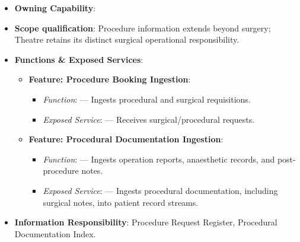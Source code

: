 \begin{itemize}

\item 
\textbf{Owning Capability}: \texttt{}



\item 
\textbf{Scope qualification}: Procedure information extends beyond surgery; Theatre retains its distinct surgical operational responsibility.



\item 
\textbf{Functions \& Exposed Services}:


\begin{itemize}

\item 
\textbf{Feature: Procedure Booking Ingestion}:


\begin{itemize}

\item 
\emph{Function}: \texttt{} — Ingests procedural and surgical requisitions.



\item 
\emph{Exposed Service}: \texttt{} — Receives surgical/\allowbreak{}procedural requests.



\end{itemize}


\item 
\textbf{Feature: Procedural Documentation Ingestion}:


\begin{itemize}

\item 
\emph{Function}: \texttt{} — Ingests operation reports, anaesthetic records, and post-procedure notes.



\item 
\emph{Exposed Service}: \texttt{} — Ingests procedural documentation, including surgical notes, into patient record streams.



\end{itemize}


\end{itemize}


\item 
\textbf{Information Responsibility}: Procedure Request Register, Procedural Documentation Index.



\end{itemize}
\label{rad:sa:160}

